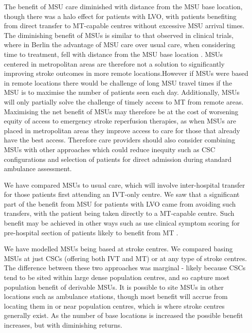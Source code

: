 The benefit of MSU care diminished with distance from the MSU base location, though there was a halo effect for patients with LVO, with patients benefiting from direct transfer to MT-capable centres without excessive MSU arrival times. The diminishing benefit of MSUs is similar to that observed in clinical trials, where in Berlin the advantage of MSU care over usual care, when considering time to treatment, fell with distance from the MSU base location \cite{koch_influence_2016}. MSUs centered in metropolitan areas are therefore not a solution to significantly improving stroke outcomes in more remote locations.However if MSUs were based in remote locations there would be challenge of long MSU travel times if the MSU is to maximise the number of patients seen each day. Additionally, MSUs will only partially solve the challenge of timely access to MT from remote areas. Maximising the net benefit of MSUs may therefore be at the cost of worsening equity of access to emergency stroke reperfusion therapies, as when MSUs are placed in metropolitan areas they improve access to care for those that already have the best access. Therefore care providers should also consider combining MSUs with other approaches which could reduce inequity such as CSC configurations and selection of patients for direct admission during standard ambulance assessment. 

We have compared MSUs to usual care, which will involve inter-hospital transfer for those patients first attending an IVT-only centre. We saw that a significant part of the benefit from MSU for patients with LVO came from avoiding such transfers, with the patient being taken directly to a MT-capable centre. Such benefit may be achieved in other ways such as use clinical symptom scoring for pre-hospital section of patients likely to benefit from MT \cite{perez_de_la_ossa_effect_2022} .

We have modelled MSUs being based at stroke centres. We compared basing MSUs at just CSCs (offering both IVT and MT) or at any type of stroke centres. The difference between these two approaches was marginal - likely because CSCs tend to be sited within large dense population centres, and so capture most population benefit of derivable MSUs. It is possible to site MSUs in other locations such as ambulance stations, though most benefit will accrue from locating them in or near population centres, which is where stroke centres generally exist. As the number of base locations is increased the possible benefit increases, but with diminishing returns. 

